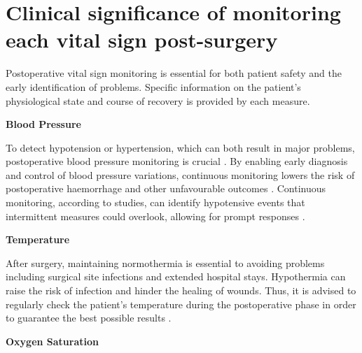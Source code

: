 \section{Clinical significance of monitoring each vital sign post-surgery} %

Postoperative vital sign monitoring is essential for both patient safety and the early identification of problems. Specific information on the patient's physiological state and course of recovery is provided by each measure.

\textbf{Blood Pressure}

To detect hypotension or hypertension, which can both result in major problems, postoperative blood pressure monitoring is crucial \cite{Kachel2021_pb}. By enabling early diagnosis and control of blood pressure variations, continuous monitoring lowers the risk of postoperative haemorrhage and other unfavourable outcomes \cite{Demetz2024_pl}. Continuous monitoring, according to studies, can identify hypotensive events that intermittent measures could overlook, allowing for prompt responses \cite{Noto2024_uz}.

\textbf{Temperature}

After surgery, maintaining normothermia is essential to avoiding problems including surgical site infections and extended hospital stays. Hypothermia can raise the risk of infection and hinder the healing of wounds. Thus, it is advised to regularly check the patient's temperature during the postoperative phase in order to guarantee the best possible results \cite{Frank1999_rb}.

\textbf{Oxygen Saturation}

